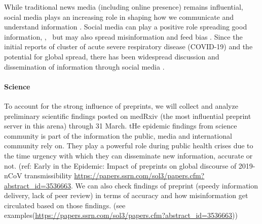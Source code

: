 While traditional news media (including online presence) remains influential,  social media plays an increasing role in shaping how we communicate and understand information \citep{LiuSieg19}. Social media can play a positive role spreading good information, \cite{BascHill20, SunYang20,AhmeQuin18},  but may also spread misinformation and feed bias \citep{ChouOa18, McKevanS19}.  Since the initial reports of cluster of acute severe respiratory disease (COVID-19) and the potential for global spread, there has been widespread discussion and dissemination of information through social media \citep{?}.






\paragraph{Science} To account for the strong influence of preprints, we will collect and analyze preliminary scientific findings posted on medRxiv (the most influential preprint server in this arena) through 31 March.  tHe epidemic findings from science community is part of the information the public, media and international community rely on. They play a powerful role during public health crises due to the time urgency with which they can disseminate new information, accurate or not. (ref: Early in the Epidemic: Impact of preprints on global discourse of 2019-nCoV transmissibility \url{https://papers.ssrn.com/sol3/papers.cfm?abstract_id=3536663}.  We can also check findings of preprint (speedy information delivery, lack of peer review) in terms of accuracy and how misinformation get circulated based on those findings. (see examples(\url{https://papers.ssrn.com/sol3/papers.cfm?abstract_id=3536663}))

